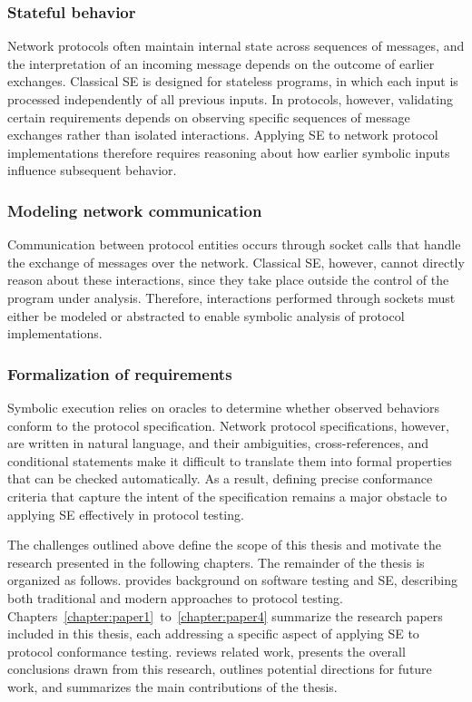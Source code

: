 \subsubsection{Stateful behavior}
Network protocols often maintain internal state across sequences of messages, and the interpretation of an incoming message depends on the outcome of earlier exchanges.
Classical SE is designed for stateless programs, in which each input is processed independently of all previous inputs.
In protocols, however, validating certain requirements depends on observing specific sequences of message exchanges rather than isolated interactions.
Applying SE to network protocol implementations therefore requires reasoning about how earlier symbolic inputs influence subsequent behavior.

\subsubsection{Modeling network communication}
Communication between protocol entities occurs through socket calls that handle the exchange of messages over the network.
Classical SE, however, cannot directly reason about these interactions, since they take place outside the control of the program under analysis.
Therefore, interactions performed through sockets must either be modeled or abstracted to enable symbolic analysis of protocol implementations.

\subsubsection{Formalization of requirements}
Symbolic execution relies on oracles to determine whether observed behaviors conform to the protocol specification.
Network protocol specifications, however, are written in natural language, and their ambiguities, cross-references, and conditional statements make it difficult to translate them into formal properties that can be checked automatically. 
As a result, defining precise conformance criteria that capture the intent of the specification remains a major obstacle to applying SE effectively in protocol testing.

The challenges outlined above define the scope of this thesis and motivate the research presented in the following chapters. 
The remainder of the thesis is organized as follows.
 provides background on software testing and SE, describing both traditional and modern approaches to protocol testing.
Chapters~\ref{chapter:paper1}~to~\ref{chapter:paper4} summarize the research papers included in this thesis, each addressing a specific aspect of applying SE to protocol conformance testing.
 reviews related work,
 presents the overall conclusions drawn from this research,  outlines potential directions for future work, and  summarizes the main contributions of the thesis.